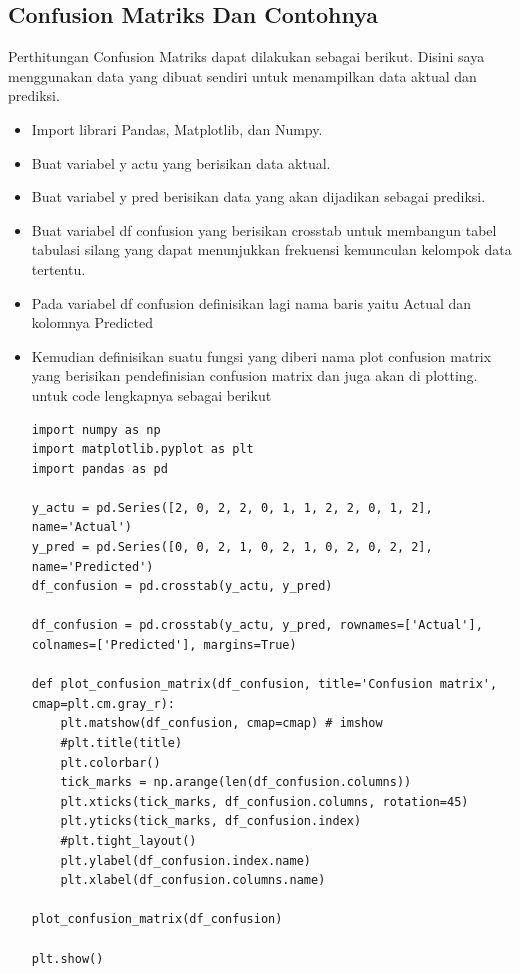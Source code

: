 \subsection{Confusion Matriks Dan Contohnya}
Perthitungan Confusion Matriks dapat dilakukan sebagai berikut. Disini saya menggunakan data yang dibuat sendiri untuk menampilkan data aktual dan prediksi.
\begin{itemize}
\item
Import librari Pandas, Matplotlib, dan Numpy.
\item
Buat variabel y actu yang berisikan data aktual.
\item
Buat variabel y pred berisikan data yang akan dijadikan sebagai prediksi.
\item
Buat variabel df confusion yang berisikan crosstab untuk membangun tabel tabulasi silang yang dapat menunjukkan frekuensi kemunculan kelompok data tertentu.
\item
Pada variabel df confusion definisikan lagi nama baris yaitu Actual dan kolomnya Predicted
\item
Kemudian definisikan suatu fungsi yang diberi nama plot confusion matrix yang berisikan pendefinisian confusion matrix dan juga akan di plotting. untuk code lengkapnya sebagai berikut 
\begin{verbatim}
import numpy as np
import matplotlib.pyplot as plt
import pandas as pd

y_actu = pd.Series([2, 0, 2, 2, 0, 1, 1, 2, 2, 0, 1, 2], name='Actual')
y_pred = pd.Series([0, 0, 2, 1, 0, 2, 1, 0, 2, 0, 2, 2], name='Predicted')
df_confusion = pd.crosstab(y_actu, y_pred)

df_confusion = pd.crosstab(y_actu, y_pred, rownames=['Actual'], colnames=['Predicted'], margins=True)

def plot_confusion_matrix(df_confusion, title='Confusion matrix', cmap=plt.cm.gray_r):
    plt.matshow(df_confusion, cmap=cmap) # imshow
    #plt.title(title)
    plt.colorbar()
    tick_marks = np.arange(len(df_confusion.columns))
    plt.xticks(tick_marks, df_confusion.columns, rotation=45)
    plt.yticks(tick_marks, df_confusion.index)
    #plt.tight_layout()
    plt.ylabel(df_confusion.index.name)
    plt.xlabel(df_confusion.columns.name)

plot_confusion_matrix(df_confusion)

plt.show()
\end{verbatim}

\par


\end{itemize}
